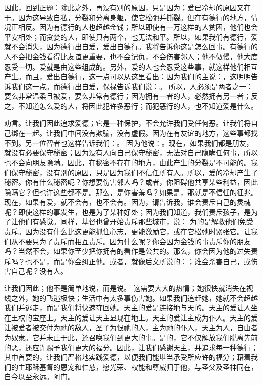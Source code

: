 因此，回到正题：除此之外，再没有别的原因，只是因为；爱已冷却的原因又在于。因为这导致自私，分裂和分离身躯，使它松弛并撕裂。但在有德行的地方，情况正相反。因为有德行的人也超越金钱；所以即使有一万这样的人贫困，他们也会平安相处；而贪婪的人，即使只有两个，也无法和平。所以，如果我们有德行，爱就不会消失，因为德行出自爱，爱出自德行。我将告诉你这是怎么回事。有德行的人不会把金钱看得比友谊更重要，也不会记仇，不会伤害邻人；他不傲慢，他大度忍受一切。爱就是由这些组成的。另外，爱的人也会忍受这些事，就这样他们相互产生。而且，爱出自德行，这一点可以从这里看出：因为我们的主说：，这明明告诉我们这一点。而德行出自爱，保禄告诉我们说：。 所以，人必须是两者之一：要么非常温柔且被爱，要么非常有德行；因为拥有一者的人，必然拥有另一者；反之，不知道怎么爱的人，将因此犯许多恶行；而犯恶行的人，也不知道爱是什么。\par

劝言。让我们因此追求爱德；它是一种保护，不会允许我们受任何恶。让我们将自己绑在一起。让我们中间没有欺骗，没有虚假。因为在有友谊的地方，这些事都找不到。另一位智者也这样告诉我们：。 因为他说：。现在，如果我们都是朋友，就没有必要保守秘密；因为没有人向自己保守秘密，无法对自己隐瞒任何事，所以也不会向朋友隐瞒。因此，在秘密不存在的地方，由此产生的分裂是不可能的。我们保守秘密，没有别的原因，只是因为我们不信任所有人。所以，爱的冷却产生了秘密。你有什么秘密呢？你想要伤害邻人吗？或者，你阻碍他共享某些利益，因此隐瞒它？但也许这些都不是。那么，是你害羞吗？如果是，那就是不信任的征兆。现在，如果有爱，就不会有，也不会有。因为，请告诉我，谁会责斥自己的灵魂呢？即使这样的事发生，也是为了某种好处；因为我们知道，我们责斥孩子，是为了让他们有感觉。同样，基督也曾开始责斥那些城市，说： 为的是解救他们免受责斥。因为没有什么比这更能抓住心志，更能激励它，或在它松弛时紧张它。让我们从不要只为了责斥而相互责斥。因为什么呢？你会因为金钱的事责斥你的朋友吗？当然不会，如果你至少把你拥有的看作是公共的。那么，你会因为他的过失责斥吗？也不是，而是你会纠正他。或者，就像后文所说的：；谁会杀害自己，或伤害自己呢？没有人。\par

让我们因此；他不是简单地说，而是说。 这需要大大的热情；她很快就消失在视线之外，她的飞逃极快；生活中有太多事伤害她。如果我们追赶她，她就不会超越我们并逃走，而是我们将快速夺回她。天主的爱是连接地与天的。天主的爱让人坐在王权的宝座上。天主的爱让天主显现在地上。天主的爱让主成为仆人。天主的爱让被爱者被交付为祂的敌人，圣子为恨祂的人，主为祂的仆人，天主为人，自由者为奴隶。它并未止于此，还召唤我们到更大的事。是的，它不仅解放我们脱离先前的恶，还应许赐予我们更大的福分。因此，让我们感谢天主，并追求每一种德行；其中首要的，让我们严格地实践爱德，以便我们能堪当承受所应许的福分；藉着我们的主耶稣基督的恩宠和仁慈，愿光荣、权能和尊威归于他，与圣父及圣神同在，自今以至永远。阿门。\par

